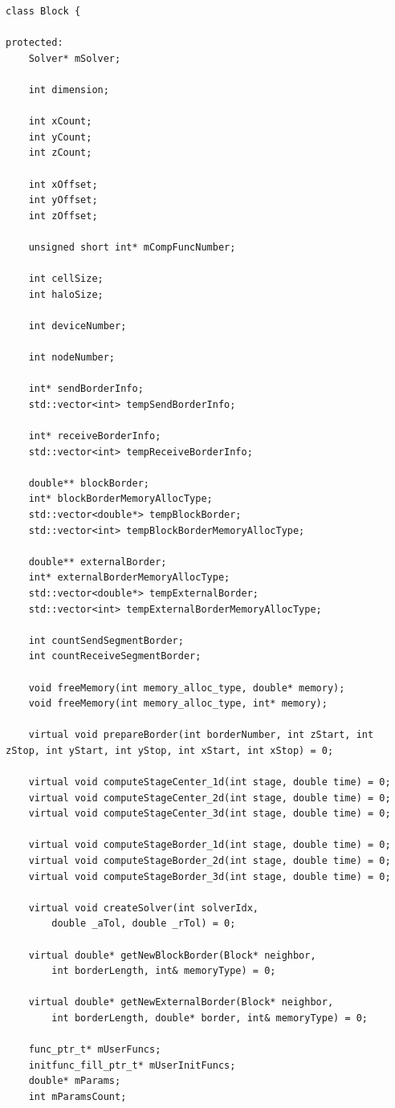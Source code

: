 \documentclass[a4paper, 14pt]{extarticle}
\theoremstyle{definition}
\begin{document}
\begin{lstlisting}
class Block {

protected:
	Solver* mSolver;

	int dimension;

	int xCount;
	int yCount;
	int zCount;

	int xOffset;
	int yOffset;
	int zOffset;

	unsigned short int* mCompFuncNumber;

	int cellSize;
	int haloSize;

	int deviceNumber;

	int nodeNumber;

	int* sendBorderInfo;
	std::vector<int> tempSendBorderInfo;

	int* receiveBorderInfo;
	std::vector<int> tempReceiveBorderInfo;

	double** blockBorder;
	int* blockBorderMemoryAllocType;
	std::vector<double*> tempBlockBorder;
	std::vector<int> tempBlockBorderMemoryAllocType;

	double** externalBorder;
	int* externalBorderMemoryAllocType;
	std::vector<double*> tempExternalBorder;
	std::vector<int> tempExternalBorderMemoryAllocType;

	int countSendSegmentBorder;
	int countReceiveSegmentBorder;

	void freeMemory(int memory_alloc_type, double* memory);
	void freeMemory(int memory_alloc_type, int* memory);

	virtual void prepareBorder(int borderNumber, int zStart, int zStop, int yStart, int yStop, int xStart, int xStop) = 0;

	virtual void computeStageCenter_1d(int stage, double time) = 0;
	virtual void computeStageCenter_2d(int stage, double time) = 0;
	virtual void computeStageCenter_3d(int stage, double time) = 0;

	virtual void computeStageBorder_1d(int stage, double time) = 0;
	virtual void computeStageBorder_2d(int stage, double time) = 0;
	virtual void computeStageBorder_3d(int stage, double time) = 0;

	virtual void createSolver(int solverIdx,
		double _aTol, double _rTol) = 0;

	virtual double* getNewBlockBorder(Block* neighbor,
		int borderLength, int& memoryType) = 0;
		
	virtual double* getNewExternalBorder(Block* neighbor,
		int borderLength, double* border, int& memoryType) = 0;

	func_ptr_t* mUserFuncs;
	initfunc_fill_ptr_t* mUserInitFuncs;
	double* mParams;
	int mParamsCount;


\end{lstlisting}
\end{document}
